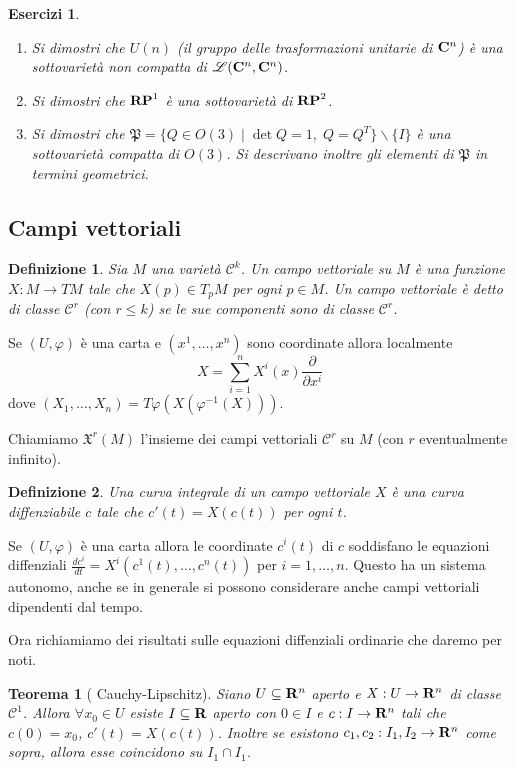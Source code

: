 \documentclass{article}
\newcommand{\PHI}{\varphi}
\newcommand{\incluso}{\subseteq}
\newcommand{\inv}{^{-1}}
\newcommand{\intersez}{\cap}
\newcommand{\ci}[1]{\mathscr{#1}}%
\newcommand{\g}[1]{\mathfrak{#1}}
\newcommand{\perogni}{\forall}
\newcommand{\di}{\partial}
\newtheorem{definizione}{ Definizione}
\newtheorem{teor}{ Teorema}
\newtheorem*{esercizi}{ Esercizi}
\begin{document}
 \begin{esercizi}
  \begin{enumerate}[label=\bf\Roman*)]
   \item Si dimostri che $U(n)$ (il gruppo delle trasformazioni unitarie di ${\bf C}^n$)
   è una sottovarietà non compatta di $\ci{L}({\bf C}^n,{\bf C}^n)$.
   \item Si dimostri che ${\bf RP}^1$ è una sottovarietà di ${\bf RP}^2$.
   \item Si dimostri che $\g{P}=\{ Q\in O(3)\;|\;\det Q=1,\; Q=Q^T\}\backslash\{I\}$
   è una sottovarietà compatta di $O(3)$. Si descrivano inoltre gli elementi di $\g{P}$ in
   termini geometrici.
  \end{enumerate}
 \end{esercizi}

 \subsection{ Campi vettoriali}
 
 \begin{definizione}
  Sia $M$ una varietà $\ci{C}^k$. Un campo vettoriale su $M$ è una funzione $X:M\to TM$
  tale che $X(p)\in T_pM$ per ogni $p\in M$. Un campo vettoriale è detto di classe $\ci{C}^r$
  (con $r\le k$) se le sue componenti sono di classe $\ci{C}^r$.
 \end{definizione}

 Se $(U,\PHI)$ è una carta e $(x^1,\dots,x^n)$ sono coordinate allora localmente
 $$X=\sum_{i=1}^nX^i(x)\frac{\di}{\di x^i}$$
 dove $(X_1,\dots,X_n)=T\PHI(X(\PHI\inv(X)))$.
 
 Chiamiamo $\g{X}^r(M)$ l'insieme dei campi vettoriali $\ci{C}^r$ su $M$ (con $r$
 eventualmente infinito).
 
 \begin{definizione}
  Una curva integrale di un campo vettoriale $X$ è una curva diffenziabile $c$ tale
  che $c'(t)=X(c(t))$ per ogni $t$.
 \end{definizione}

 Se $(U,\PHI)$ è una carta allora le coordinate $c^i(t)$ di $c$ soddisfano le equazioni
 diffenziali $\frac{dc^i}{dt}=X^i(c^1(t),\dots,c^n(t))$ per $i=1,\dots,n$. Questo ha un
 sistema autonomo, anche se in generale si possono considerare anche campi vettoriali
 dipendenti dal tempo.
 
 Ora richiamiamo dei risultati sulle equazioni diffenziali ordinarie che daremo per noti.
 
 \begin{teor}[ Cauchy-Lipschitz]
  Siano $U\incluso{\bf R}^n$ aperto e $X:U\to{\bf R}^n$ di classe $\ci{C}^1$. Allora
  $\perogni x_0\in U$ esiste $I\incluso{\bf R}$ aperto con $0\in I$ e $c:I\to{\bf R}^n$
  tali che $c(0)=x_0$, $c'(t)=X(c(t))$. Inoltre se esistono $c_1,c_2:I_1,I_2\to{\bf R}^n$
  come sopra, allora esse coincidono su $I_1\intersez I_1$.
 \end{teor}
\end{document}
